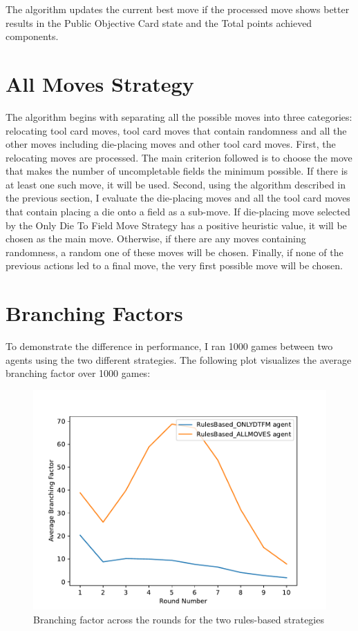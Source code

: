 The algorithm updates the current best move if the processed move shows better results in the Public Objective Card state and the Total points achieved components.


\section{All Moves Strategy}

The algorithm begins with separating all the possible moves into three categories: relocating tool card moves, tool card moves that contain randomness and all the other 
moves including die-placing moves and other tool card moves. First, the relocating moves are processed. The main criterion followed is to choose the move
that makes the number of uncompletable fields the minimum possible. If there is at least one such move, it will be used. Second, using the algorithm described
in the previous section, I evaluate the die-placing moves and all the tool card moves that contain placing a die onto a field as a sub-move. If die-placing move selected by the
Only Die To Field Move Strategy has a positive heuristic value, it will be chosen as the main move. Otherwise, if there are any moves
containing randomness, a random one of these moves will be chosen. Finally, if none of the previous actions led to a final move, the very first possible move will be chosen.

\section{Branching Factors}

To demonstrate the difference in performance, I ran 1000 games between two agents using the two different strategies. The following plot visualizes
the average branching factor over 1000 games:


\begin{figure}[H]
    \caption{ Branching factor across the rounds for the two rules-based strategies}
    \centerline{\mbox{\includegraphics[width=150mm]{img/rules-based_agents_branching_factor.pdf}}}
    \label{fig:example}
\end{figure}
